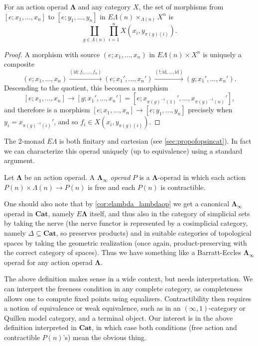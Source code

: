 \documentclass{amsbook} %
\newcommand{\mb}{\mathbf}
\newcommand{\id}{\textrm{id}}
\numberwithin{section}{chapter}
\begin{document}
\begin{lem}\label{hom-set-lemma}
For an action operad $\mb{\Lambda}$ and any category $X$, the set of morphisms from $[e; x_1, \ldots, x_n]$ to $[e; y_1, \ldots, y_n]$ in $E\Lambda(n) \times_{\Lambda(n)} X^{n}$ is
\[
\coprod_{g \in \Lambda(n)} \prod_{i=1}^{n} X(x_i, y_{\pi(g)(i)}).
\]
\end{lem}
\begin{proof}
A morphism with source $(e; x_1, \ldots, x_n)$ in $E\Lambda(n) \times X^{n}$ is uniquely a composite
\[
(e; x_1, \ldots, x_n) \stackrel{(\id; f_{1}, \ldots, f_{n})}{\longrightarrow} (e; x_1', \ldots, x_n') \stackrel{(!; \id, \ldots, \id)}{\longrightarrow} (g; x_1', \ldots, x_n').
\]
Descending to the quotient, this becomes a morphism
\[
[e; x_1, \ldots, x_n] \to [g; x_1', \ldots, x_n'] = [e; x_{\pi(g)^{-1}(1)}', \ldots, x_{\pi(g)^{-1}(n)}'],
\]
and therefore is a morphism $[e; x_1, \ldots, x_n] \to [e; y_1, \ldots, y_n]$ precisely when $y_i = x_{\pi(g)^{-1}(i)}'$, and so $f_i \in   X(x_i, y_{\pi(g)(i)})$.
\end{proof}


The 2-monad $E\Lambda$ is both finitary and cartesian (see \cref{sec:propofopsincat}).  In fact we can characterize this operad uniquely (up to equivalence) using a standard argument.

\begin{Defi}
Let $\mb{\Lambda}$ be an action operad.  A \textit{$\mb{\Lambda}_{\infty}$ operad} $P$ is a $\mb{\Lambda}$-operad in which each action $P(n) \times \Lambda(n) \rightarrow P(n)$ is free and each $P(n)$ is contractible.
\end{Defi}

\begin{rem}
One should also note that by \cref{cor:elambda_lambdaop} we get a canonical $\mb{\Lambda}_{\infty}$ operad in $\mb{Cat}$, namely $E \mb{\Lambda}$ itself, and thus also in the category of simplicial sets by taking the nerve (the nerve functor is represented by a cosimplicial category, namely $\Delta \subseteq \mb{Cat}$, so preserves products) and in suitable categories of topological spaces by taking the geometric realization (once again, product-preserving with the correct category of spaces).  Thus we have something like a Barratt-Eccles $\mb{\Lambda}_{\infty}$ operad for any action operad $\mb{\Lambda}$.
\end{rem}

\begin{rem}
The above definition makes sense in a wide context, but needs interpretation.  We can interpret the freeness condition in any complete category, as completeness allows one to compute fixed points using equalizers.  Contractibility then requires a notion of equivalence or weak equivalence, such as in an $(\infty, 1)$-category or Quillen model category, and a terminal object.  Our interest is in the above definition interpreted in $\mb{Cat}$, in which case both conditions (free action and contractible $P(n)$'s) mean the obvious thing.
\end{rem}
\end{document}
